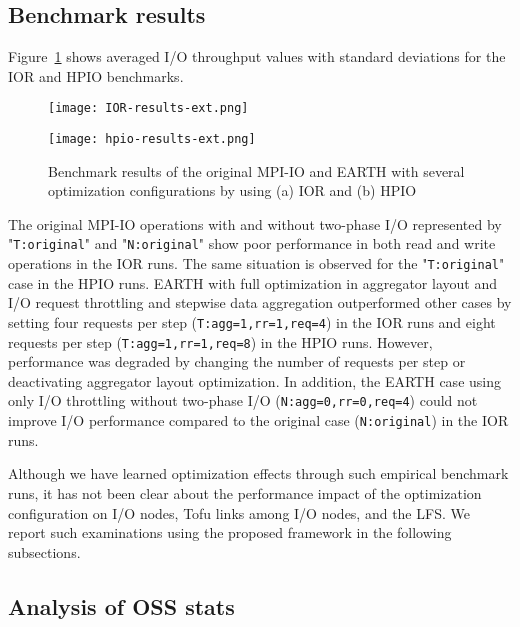 \documentclass{jhps}
\begin{document}
\subsection{Benchmark results}

Figure~\ref{fig:IOR_HPIO_PERF} shows averaged I/O throughput values
with standard deviations for the IOR and HPIO benchmarks. 
%
\begin{figure}[tb]
\centering
\begin{minipage}[t]{0.46\textwidth}
 \centering
 \texttt{[image: IOR-results-ext.png]}
 \label{fig:IOR_PERF}
\end{minipage}
%
\noindent
\begin{minipage}[t]{0.46\textwidth}
 \texttt{[image: hpio-results-ext.png]}
 \label{fig:HPIO_PERF}
\end{minipage}
\caption{
Benchmark results of the original MPI-IO and EARTH with several optimization
configurations by using (a) IOR and (b) HPIO}
\label{fig:IOR_HPIO_PERF}
\end{figure}
%

The original MPI-IO operations with and without two-phase I/O represented by
"{\tt T:original}" and "{\tt N:original}" show poor performance in both read and write
operations in the IOR runs.
The same situation is observed for the "{\tt T:original}" case in the HPIO runs.
EARTH with full optimization in aggregator layout and I/O request throttling
and stepwise data aggregation outperformed other cases by setting four requests per step
({\tt T:agg=1,rr=1,req=4}) in the IOR runs and eight requests per step
({\tt T:agg=1,rr=1,req=8}) in the HPIO runs.
However, performance was degraded by changing the number of requests per step
or deactivating aggregator layout optimization.
In addition, the EARTH case using only I/O throttling without two-phase I/O
({\tt N:agg=0,rr=0,req=4}) could not improve I/O performance
compared to the original case ({\tt N:original}) in the IOR runs.

Although we have learned optimization effects through such empirical benchmark runs,
it has not been clear about the performance impact of the optimization configuration
on I/O nodes, Tofu links among I/O nodes, and the LFS.
We report such examinations using the proposed framework in the following
subsections.

\subsection{Analysis of OSS stats}
\end{document}
